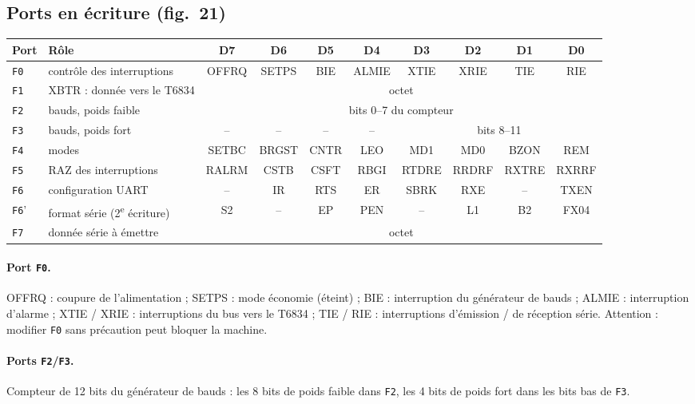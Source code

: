 \documentclass[a4paper,10pt]{article}
\newcommand{\hex}[1]{\texttt{#1}}
\begin{document}
\subsection{Ports en écriture (fig.~21)}
\begin{center}\small
\begin{tabular}{@{}l>{\raggedright}p{3.2cm}*{8}{c}@{}}
\toprule
Port & Rôle & D7 & D6 & D5 & D4 & D3 & D2 & D1 & D0 \\
\midrule
\hex{F0} & contrôle des interruptions & OFFRQ & SETPS & BIE & ALMIE & XTIE & XRIE & TIE & RIE \\
\hex{F1} & XBTR : donnée vers le T6834 & \multicolumn{8}{c}{octet} \\
\hex{F2} & bauds, poids faible & \multicolumn{8}{c}{bits 0--7 du compteur} \\
\hex{F3} & bauds, poids fort & -- & -- & -- & -- & \multicolumn{4}{c}{bits 8--11} \\
\hex{F4} & modes & SETBC & BRGST & CNTR & LEO & MD1 & MD0 & BZON & REM \\
\hex{F5} & RAZ des interruptions & RALRM & CSTB & CSFT & RBGI & RTDRE & RRDRF & RXTRE & RXRRF \\
\hex{F6} & configuration UART & -- & IR & RTS & ER & SBRK & RXE & -- & TXEN \\
\hex{F6}' & format série (2\textsuperscript{e} écriture) & S2 & -- & EP & PEN & -- & L1 & B2 & FX04 \\
\hex{F7} & donnée série à émettre & \multicolumn{8}{c}{octet} \\
\bottomrule
\end{tabular}
\end{center}

\paragraph{Port \hex{F0}.} OFFRQ : coupure de l'alimentation ; SETPS : mode
économie (éteint) ; BIE : interruption du générateur de bauds ; ALMIE :
interruption d'alarme ; XTIE / XRIE : interruptions du bus vers le T6834 ;
TIE / RIE : interruptions d'émission / de réception série.
Attention : modifier \hex{F0} sans précaution peut bloquer la machine.

\paragraph{Ports \hex{F2}/\hex{F3}.} Compteur de 12 bits du générateur de
bauds : les 8 bits de poids faible dans \hex{F2}, les 4 bits de poids fort
dans les bits bas de \hex{F3}.
\end{document}
